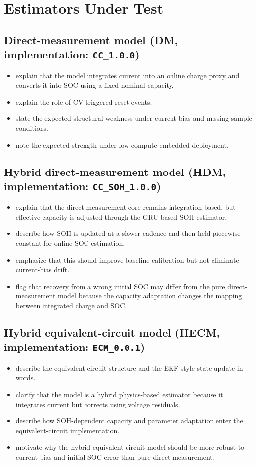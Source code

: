 \documentclass[review,nopreprintline]{elsarticle}
\begin{document}
\section{Estimators Under Test}
\subsection{Direct-measurement model (DM, implementation: \texttt{CC\_1.0.0})}
\begin{itemize}[leftmargin=*]
    \item explain that the model integrates current into an online charge proxy and converts it into SOC using a fixed nominal capacity.
    \item explain the role of CV-triggered reset events.
    \item state the expected structural weakness under current bias and missing-sample conditions.
    \item note the expected strength under low-compute embedded deployment.
\end{itemize}

\subsection{Hybrid direct-measurement model (HDM, implementation: \texttt{CC\_SOH\_1.0.0})}
\begin{itemize}[leftmargin=*]
    \item explain that the direct-measurement core remains integration-based, but effective capacity is adjusted through the GRU-based SOH estimator.
    \item describe how SOH is updated at a slower cadence and then held piecewise constant for online SOC estimation.
    \item emphasize that this should improve baseline calibration but not eliminate current-bias drift.
    \item flag that recovery from a wrong initial SOC may differ from the pure direct-measurement model because the capacity adaptation changes the mapping between integrated charge and SOC.
\end{itemize}

\subsection{Hybrid equivalent-circuit model (HECM, implementation: \texttt{ECM\_0.0.1})}
\begin{itemize}[leftmargin=*]
    \item describe the equivalent-circuit structure and the EKF-style state update in words.
    \item clarify that the model is a hybrid physics-based estimator because it integrates current but corrects using voltage residuals.
    \item describe how SOH-dependent capacity and parameter adaptation enter the equivalent-circuit implementation.
    \item motivate why the hybrid equivalent-circuit model should be more robust to current bias and initial SOC error than pure direct measurement.
\end{itemize}
\end{document}
